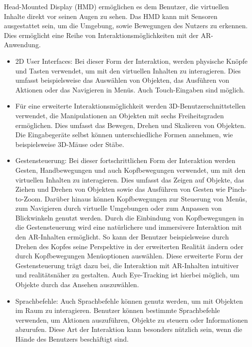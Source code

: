 Head-Mounted Display (HMD) ermöglichen es dem Benutzer, die virtuellen Inhalte
direkt vor seinen Augen zu sehen. Das HMD kann mit Sensoren ausgestattet sein,
um die Umgebung, sowie Bewegungen des Nutzers zu erkennen. Dies ermöglicht eine
Reihe von Interaktionsmöglichkeiten mit der AR-Anwendung.
\begin{itemize}
      \item 2D User Interfaces: Bei dieser Form der Interaktion,
            werden physische Knöpfe und Tasten verwendet, um mit den virtuellen Inhalten zu interagieren.
            Dies umfasst beispielsweise das Auswählen von Objekten, das Ausführen von Aktionen oder das Navigieren in Menüs. Auch Touch-Eingaben sind möglich.

      \item Für eine erweiterte Interaktionsmöglichkeit werden 3D-Benutzerschnittstellen
            verwendet, die Manipulationen an Objekten mit sechs Freiheitsgraden
            ermöglichen. Dies umfasst das Bewegen, Drehen und Skalieren von Objekten. Die
            Eingabegeräte selbst können unterschiedliche Formen annehmen, wie
            beispielsweise 3D-Mäuse oder Stäbe.

      \item Gestensteuerung: Bei dieser fortschrittlichen Form der Interaktion werden
            Gesten, Handbewegungen und auch Kopfbewegungen verwendet, um mit den virtuellen
            Inhalten zu interagieren. Dies umfasst das Zeigen auf Objekte, das Ziehen und
            Drehen von Objekten sowie das Ausführen von Gesten wie Pinch-to-Zoom. Darüber
            hinaus können Kopfbewegungen zur Steuerung von Menüs, zum Navigieren durch
            virtuelle Umgebungen oder zum Anpassen von Blickwinkeln genutzt werden. Durch
            die Einbindung von Kopfbewegungen in die Gestensteuerung wird eine natürlichere
            und immersivere Interaktion mit den AR-Inhalten ermöglicht. So kann der
            Benutzer beispielsweise durch Drehen des Kopfes seine Perspektive in der
            erweiterten Realität ändern oder durch Kopfbewegungen Menüoptionen auswählen.
            Diese erweiterte Form der Gestensteuerung trägt dazu bei, die Interaktion mit
            AR-Inhalten intuitiver und realitätsnäher zu gestalten. Auch Eye-Tracking ist
            hierbei möglich, um Objekte durch das Ansehen auszuwählen.

      \item Sprachbefehle: Auch Sprachbefehle können genutz werden, um mit Objekten im Raum
            zu interagieren. Benutzer können bestimmte Sprachbefehle verwenden, um Aktionen
            auszuführen, Objekte zu steuern oder Informationen abzurufen. Diese Art der
            Interaktion kann besonders nützlich sein, wenn die Hände des Benutzers
            beschäftigt sind.
\end{itemize}

